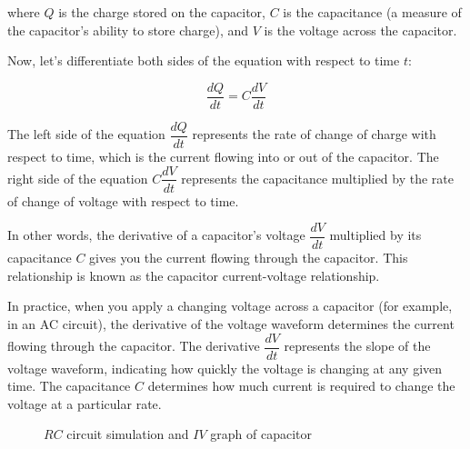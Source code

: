 \documentclass[13pt,a4paper]{report}
\begin{document}
where $Q$ is the charge stored on the capacitor, $C$ is the capacitance (a measure of the capacitor's ability to store charge), and $V$ is the voltage across the capacitor.

Now, let's differentiate both sides of the equation with respect to time $t$:

$$\dfrac{dQ}{dt}=C\dfrac{dV}{dt}$$

The left side of the equation $\dfrac{dQ}{dt}$ represents the rate of change of charge with respect to time, which is the current flowing into or out of the capacitor. The right side of the equation $C\dfrac{dV}{dt}$ represents the capacitance multiplied by the rate of change of voltage with respect to time.

In other words, the derivative of a capacitor's voltage $\dfrac{dV}{dt}$ multiplied by its capacitance $C$ gives you the current flowing through the capacitor. This relationship is known as the capacitor current-voltage relationship.

In practice, when you apply a changing voltage across a capacitor (for example, in an AC circuit), the derivative of the voltage waveform determines the current flowing through the capacitor. The derivative $\dfrac{dV}{dt}$ represents the slope of the voltage waveform, indicating how quickly the voltage is changing at any given time. The capacitance $C$ determines how much current is required to change the voltage at a particular rate.

\begin{center}
\begin{figure}[H]
\centering
\textcolor{black}{\fboxrule=2pt}
\caption{$RC$ circuit simulation and $IV$ graph of capacitor}
\end{figure}
\end{center}

\vspace{-0.8cm}
\end{document}
